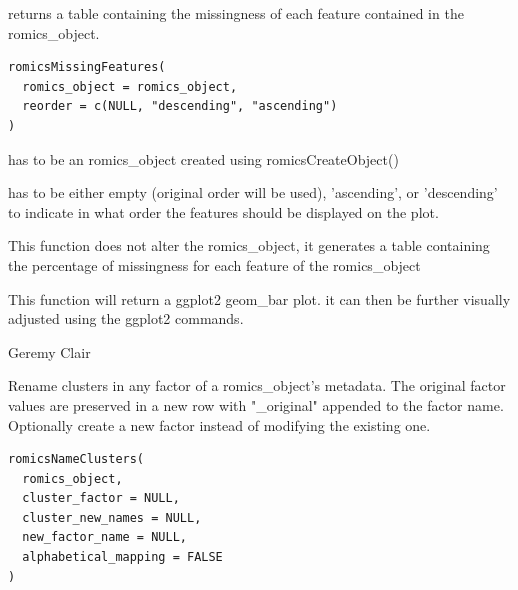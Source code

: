 \documentclass[a4paper]{book}
\begin{document}
%
\begin{Description}
returns a table containing the missingness of each feature contained in the romics\_object.
\end{Description}
%
\begin{Usage}
\begin{verbatim}
romicsMissingFeatures(
  romics_object = romics_object,
  reorder = c(NULL, "descending", "ascending")
)
\end{verbatim}
\end{Usage}
%
\begin{Arguments}
\begin{ldescription}
\item[\code{romics\_object}] has to be an romics\_object created using romicsCreateObject()

\item[\code{reorder}] has to be either empty (original order will be used), 'ascending', or 'descending' to indicate in what order the features should be displayed on the plot.
\end{ldescription}
\end{Arguments}
%
\begin{Details}
This function does not alter the romics\_object, it generates a table containing the percentage of missingness for each feature of the romics\_object
\end{Details}
%
\begin{Value}
This function will return a ggplot2 geom\_bar plot. it can then be further visually adjusted using the ggplot2 commands.
\end{Value}
%
\begin{Author}
Geremy Clair
\end{Author}
%
\begin{Description}
Rename clusters in any factor of a romics\_object's metadata.
The original factor values are preserved in a new row with "\_original" appended to the factor name.
Optionally create a new factor instead of modifying the existing one.
\end{Description}
%
\begin{Usage}
\begin{verbatim}
romicsNameClusters(
  romics_object,
  cluster_factor = NULL,
  cluster_new_names = NULL,
  new_factor_name = NULL,
  alphabetical_mapping = FALSE
)
\end{verbatim}
\end{Usage}
\end{document}
